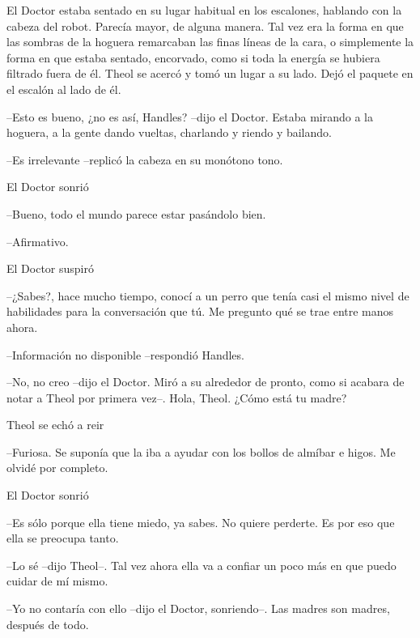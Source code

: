 El Doctor estaba sentado en su lugar habitual en los escalones, hablando con la cabeza del robot. Parecía mayor, de alguna manera. Tal vez era la forma en que las sombras de la hoguera remarcaban las finas líneas de la cara, o simplemente la forma en que estaba sentado, encorvado, como si toda la energía se hubiera filtrado fuera de él. Theol se acercó y tomó un lugar a su lado. Dejó el paquete en el escalón al lado de él.



--Esto es bueno, ¿no es así, Handles? --dijo el Doctor. Estaba mirando a la hoguera, a la gente dando vueltas, charlando y riendo y bailando.



--Es irrelevante --replicó la cabeza en su monótono tono.



El Doctor sonrió 

--Bueno, todo el mundo parece estar pasándolo bien.



--Afirmativo.



El Doctor suspiró 

--¿Sabes?, hace mucho tiempo, conocí a un perro que tenía casi el mismo nivel de habilidades para la conversación que tú. Me pregunto qué se trae entre manos ahora.



--Información no disponible --respondió Handles.



--No, no creo --dijo el Doctor. Miró a su alrededor de pronto, como si acabara de notar a Theol por primera vez--. Hola, Theol. ¿Cómo está tu madre?



Theol se echó a reir 

--Furiosa. Se suponía que la iba a ayudar con los bollos de almíbar e higos. Me olvidé por completo.



El Doctor sonrió 

--Es sólo porque ella tiene miedo, ya sabes. No quiere perderte. Es por eso que ella se preocupa tanto.



--Lo sé --dijo Theol--. Tal vez ahora ella va a confiar un poco más en que puedo cuidar de mí mismo.



--Yo no contaría con ello --dijo el Doctor, sonriendo--. Las madres son madres, después de todo.



